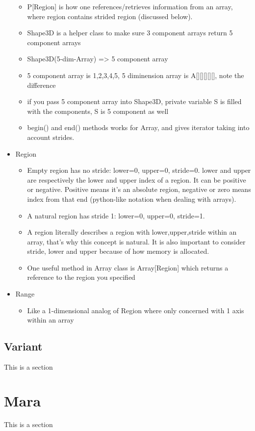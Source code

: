 \documentclass{article}
\begin{document}
\begin{itemize}
\begin{itemize}
		\item P[Region] is how one references/retrieves information from an array, where region contains strided region (discussed below).
		\item Shape3D is a helper class to make sure 3 component arrays return 5 component arrays
		\item Shape3D(5-dim-Array) => 5 component array
		\item 5 component array is {1,2,3,4,5}, 5 diminension array is A[][][][][], note the difference
		\item if you pass 5 component array into Shape3D, private variable S is filled with the components, S is 5 component as well
		\item begin() and end() methods works for Array, and gives iterator taking into account strides.
	\end{itemize}
	\item Region
	\begin{itemize}
		\item Empty region has no stride: lower=0, upper=0, stride=0. lower and upper are respectively the lower and upper index of a region. It can be positive or negative. Positive means it's an absolute region, negative or zero means index from that end (python-like notation when dealing with arrays). 
		\item A natural region has stride 1: lower=0, upper=0, stride=1.
		\item A region literally describes a region with lower,upper,stride within an array, that's why this concept is natural. It is also important to consider stride, lower and upper because of how memory is allocated. 
		\item One useful method in Array class is Array[Region] which returns a reference to the region you specified
	\end{itemize}
	\item Range
	\begin{itemize}
		\item Like a 1-dimensional analog of Region where only concerned with 1 axis within an array

	\end{itemize}
\end{itemize}

\subsection{Variant}
This is a section 

\section{Mara}
This is a section 
\end{document}
